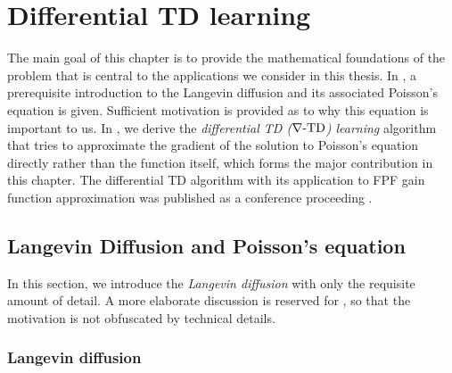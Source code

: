 \chapter{Differential TD learning} 
\label{ch:diff_td}
The main goal of this chapter is to provide the mathematical foundations of the problem that is central to the applications we consider in this thesis.
In , a prerequisite introduction to the Langevin diffusion and its associated Poisson's equation is given. Sufficient motivation is provided as to why this equation is important to us. In , we derive the \textit{differential TD ($\nabla\text{-TD}$) learning} algorithm that tries to approximate the gradient of the solution to Poisson's equation directly rather than the function itself, which forms the major contribution in this chapter. The differential TD algorithm with its application to FPF gain function approximation was published as a conference proceeding \cite{raddevmey16}. 


\section{Langevin Diffusion and Poisson's equation}
\label{s:langevin_diffusion}
In this section, we introduce the \textit{Langevin diffusion} with only the requisite amount of detail. A more elaborate discussion is reserved for , so that the motivation is not obfuscated by  technical details.  

\subsection{Langevin diffusion}

